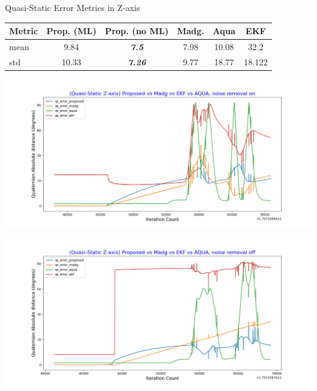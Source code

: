 \documentclass[aspectratio=169,xcolor=dvipsnames]{beamer}
\begin{document}
\begin{frame}{Quasi-Static Error Metrics in Z-axis}
\small
\begin{minipage}{\textwidth}
  \centering
  \scriptsize
  \label{tab:quasi_static_z}
  \begin{tabular}{lccccc}
    \toprule
    Metric & Prop. (ML) & Prop. (no ML) & Madg. & Aqua & EKF \\
    \midrule
    mean & 9.84 & \textit{\textbf{7.5}} & 7.98 & 10.08 & 32.2 \\
    std & 10.33 & \textit{\textbf{7.26}} & 9.77 & 18.77 & 18.122 \\
    \bottomrule
  \end{tabular}
\end{minipage}

\vspace{0.5cm}

\begin{minipage}{0.5\textwidth}
  \centering
  \includegraphics[width=\linewidth,height=0.35\textheight]{graphs/qs_ml_z.png}
\end{minipage}%
\hfill
\begin{minipage}{0.5\textwidth}
  \centering
  \includegraphics[width=\linewidth]{graphs/qs_no_ml_z.png}
\end{minipage}

\end{frame}
\end{document}
